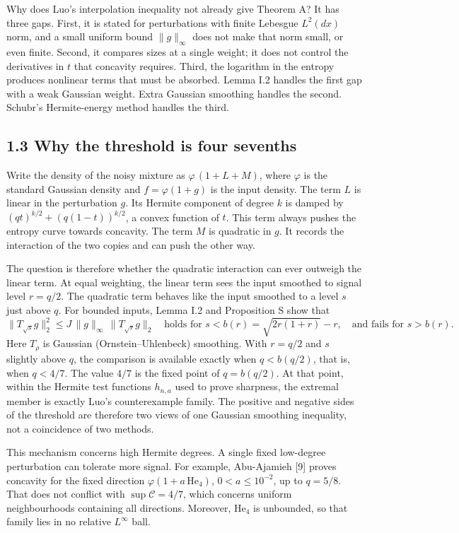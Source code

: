 \documentclass[
  british,
  10pt,
]{article}
\begin{document}
Why does Luo's interpolation inequality not already give Theorem A? It
has three gaps. First, it is stated for perturbations with finite
Lebesgue \(L^2(dx)\) norm, and a small uniform bound \(\|g\|_\infty\)
does not make that norm small, or even finite. Second, it compares sizes
at a single weight; it does not control the derivatives in \(t\) that
concavity requires. Third, the logarithm in the entropy produces
nonlinear terms that must be absorbed. Lemma I.2 handles the first gap
with a weak Gaussian weight. Extra Gaussian smoothing handles the
second. Schubr's Hermite-energy method handles the third.

\subsection{1.3 Why the threshold is four
sevenths}\label{why-the-threshold-is-four-sevenths}

Write the density of the noisy mixture as \(\varphi\,(1+L+M)\), where
\(\varphi\) is the standard Gaussian density and \(f=\varphi(1+g)\) is
the input density. The term \(L\) is linear in the perturbation \(g\).
Its Hermite component of degree \(k\) is damped by
\((qt)^{k/2}+(q(1-t))^{k/2}\), a convex function of \(t\). This term
always pushes the entropy curve towards concavity. The term \(M\) is
quadratic in \(g\). It records the interaction of the two copies and can
push the other way.

The question is therefore whether the quadratic interaction can ever
outweigh the linear term. At equal weighting, the linear term sees the
input smoothed to signal level \(r=q/2\). The quadratic term behaves
like the input smoothed to a level \(s\) just above \(q\). For bounded
inputs, Lemma I.2 and Proposition S show that \[
\|T_{\sqrt s}g\|_2^2\le J\,\|g\|_\infty\,\|T_{\sqrt r}g\|_2
\quad\text{holds for } s<b(r)=\sqrt{2r(1+r)}-r,
\quad\text{and fails for } s>b(r).
\] Here \(T_\rho\) is Gaussian (Ornstein--Uhlenbeck) smoothing. With
\(r=q/2\) and \(s\) slightly above \(q\), the comparison is available
exactly when \(q<b(q/2)\), that is, when \(q<4/7\). The value \(4/7\) is
the fixed point of \(q=b(q/2)\). At that point, within the Hermite test
functions \(h_{n,a}\) used to prove sharpness, the extremal member is
exactly Luo's counterexample family. The positive and negative sides of
the threshold are therefore two views of one Gaussian smoothing
inequality, not a coincidence of two methods.

This mechanism concerns high Hermite degrees. A single fixed low-degree
perturbation can tolerate more signal. For example, Abu-Ajamieh {[}9{]}
proves concavity for the fixed direction
\(\varphi(1+a\,\mathrm{He}_4)\), \(0<a\le10^{-2}\), up to \(q=5/8\).
That does not conflict with \(\sup\mathcal C=4/7\), which concerns
uniform neighbourhoods containing all directions. Moreover,
\(\mathrm{He}_4\) is unbounded, so that family lies in no relative
\(L^\infty\) ball.
\end{document}
